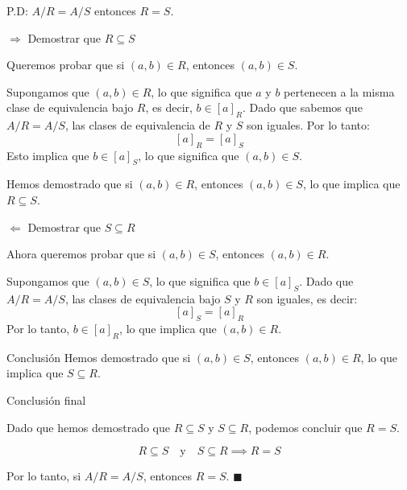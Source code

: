 \begin{solution}
    P.D: \( A/R = A/S \) entonces $R=S$.
    
    $\Rightarrow$ Demostrar que \( R \subseteq S \)
    
    Queremos probar que si \( (a, b) \in R \), entonces \( (a, b) \in S \).
    
    Supongamos que \( (a, b) \in R \), lo que significa que \( a \) y \( b \) pertenecen a la misma clase de equivalencia bajo \( R \), es decir, \( b \in [a]_R \). Dado que sabemos que \( A/R = A/S \), las clases de equivalencia de \( R \) y \( S \) son iguales. Por lo tanto:
    \[
    [a]_R = [a]_S
    \]
    Esto implica que \( b \in [a]_S \), lo que significa que \( (a, b) \in S \).
    
    Hemos demostrado que si \( (a, b) \in R \), entonces \( (a, b) \in S \), lo que implica que \( R \subseteq S \).
    
    $\Leftarrow$ Demostrar que \( S \subseteq R \)
    
    Ahora queremos probar que si \( (a, b) \in S \), entonces \( (a, b) \in R \).
    
    Supongamos que \( (a, b) \in S \), lo que significa que \( b \in [a]_S \). Dado que \( A/R = A/S \), las clases de equivalencia bajo \( S \) y \( R \) son iguales, es decir:
    \[
    [a]_S = [a]_R
    \]
    Por lo tanto, \( b \in [a]_R \), lo que implica que \( (a, b) \in R \).
    
    Conclusión
    Hemos demostrado que si \( (a, b) \in S \), entonces \( (a, b) \in R \), lo que implica que \( S \subseteq R \).
    
    Conclusión final
    
    Dado que hemos demostrado que \( R \subseteq S \) y \( S \subseteq R \), podemos concluir que \( R = S \).
    
    \[
    R \subseteq S \quad \text{y} \quad S \subseteq R \implies R = S
    \]
    
    Por lo tanto, si \( A/R = A/S \), entonces \( R = S \). \(\blacksquare\)
\end{solution}